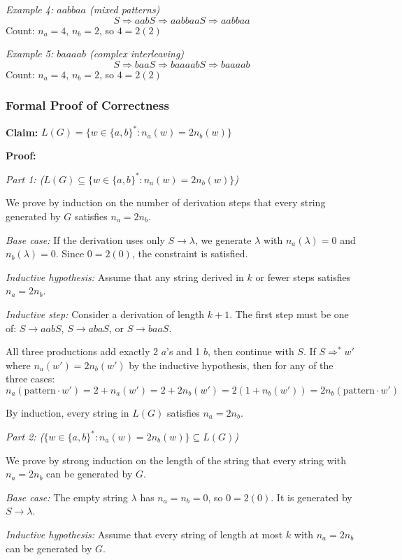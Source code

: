 \documentclass[12pt]{article}
\begin{document}
\textit{Example 4: $aabbaa$ (mixed patterns)}
$$S \Rightarrow aabS \Rightarrow aabbaaS \Rightarrow aabbaa$$
Count: $n_a = 4$, $n_b = 2$, so $4 = 2(2)$ \checkmark

\textit{Example 5: $baaaab$ (complex interleaving)}
$$S \Rightarrow baaS \Rightarrow baaaabS \Rightarrow baaaab$$
Count: $n_a = 4$, $n_b = 2$, so $4 = 2(2)$ \checkmark

\subsubsection{Formal Proof of Correctness}

\textbf{Claim:} $L(G) = \{w \in \{a,b\}^* : n_a(w) = 2n_b(w)\}$

\textbf{Proof:}

\textit{Part 1: ($L(G) \subseteq \{w \in \{a,b\}^* : n_a(w) = 2n_b(w)\}$)}

We prove by induction on the number of derivation steps that every string generated by $G$ satisfies $n_a = 2n_b$.

\textit{Base case:} If the derivation uses only $S \rightarrow \lambda$, we generate $\lambda$ with $n_a(\lambda) = 0$ and $n_b(\lambda) = 0$. Since $0 = 2(0)$, the constraint is satisfied.

\textit{Inductive hypothesis:} Assume that any string derived in $k$ or fewer steps satisfies $n_a = 2n_b$.

\textit{Inductive step:} Consider a derivation of length $k+1$. The first step must be one of: $S \rightarrow aabS$, $S \rightarrow abaS$, or $S \rightarrow baaS$.

All three productions add exactly 2 $a$'s and 1 $b$, then continue with $S$. If $S \Rightarrow^* w'$ where $n_a(w') = 2n_b(w')$ by the inductive hypothesis, then for any of the three cases:
$$n_a(\text{pattern} \cdot w') = 2 + n_a(w') = 2 + 2n_b(w') = 2(1 + n_b(w')) = 2n_b(\text{pattern} \cdot w')$$

By induction, every string in $L(G)$ satisfies $n_a = 2n_b$.

\textit{Part 2: ($\{w \in \{a,b\}^* : n_a(w) = 2n_b(w)\} \subseteq L(G)$)}

We prove by strong induction on the length of the string that every string with $n_a = 2n_b$ can be generated by $G$.

\textit{Base case:} The empty string $\lambda$ has $n_a = n_b = 0$, so $0 = 2(0)$. It is generated by $S \rightarrow \lambda$.

\textit{Inductive hypothesis:} Assume that every string of length at most $k$ with $n_a = 2n_b$ can be generated by $G$.
\end{document}
